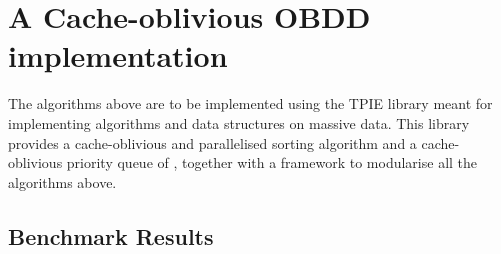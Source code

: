 \section{A Cache-oblivious OBDD implementation} \label{sec:implementation}
The algorithms above are to be implemented using the TPIE library \cite{TPIE}
meant for implementing algorithms and data structures on massive data. This
library provides a cache-oblivious and parallelised sorting algorithm and a
cache-oblivious priority queue of \cite{Sanders01}, together with a framework to
modularise all the algorithms above.

\subsection{Benchmark Results} \label{sec:implementation__benchmarks}



